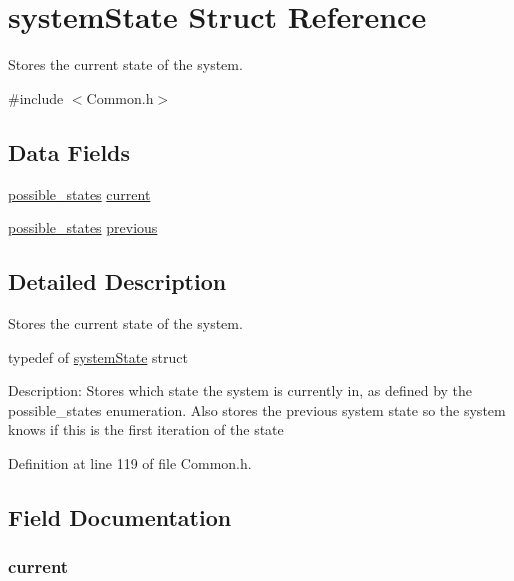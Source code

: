 \hypertarget{structsystem_state}{\section{system\+State Struct Reference}
\label{structsystem_state}
}


Stores the current state of the system.  




{\ttfamily \#include $<$Common.\+h$>$}

\subsection*{Data Fields}
\begin{DoxyCompactItemize}
\item 
\hyperlink{_common_8h_a05931287b056487cf89495f39026fbe1}{possible\+\_\+states} \hyperlink{structsystem_state_a18284a4a782e71c070e1d2e80734509d}{current}
\item 
\hyperlink{_common_8h_a05931287b056487cf89495f39026fbe1}{possible\+\_\+states} \hyperlink{structsystem_state_af2f2716b4afa23c8b53a9351a0924b6b}{previous}
\end{DoxyCompactItemize}


\subsection{Detailed Description}
Stores the current state of the system. 



 typedef of \hyperlink{structsystem_state}{system\+State} struct

Description\+: Stores which state the system is currently in, as defined by the possible\+\_\+states enumeration. Also stores the previous system state so the system knows if this is the first iteration of the state 

Definition at line 119 of file Common.\+h.



\subsection{Field Documentation}
\hypertarget{structsystem_state_a18284a4a782e71c070e1d2e80734509d}{
\subsubsection[{current}]{ current}}\label{structsystem_state_a18284a4a782e71c070e1d2e80734509d}


